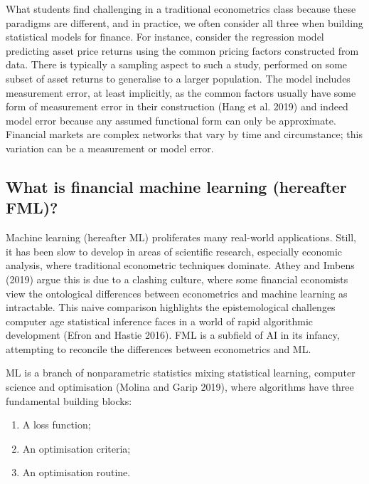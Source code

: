\documentclass{article}
\providecommand{\tightlist}{%
  \setlength{\itemsep}{0pt}\setlength{\parskip}{0pt}}
\begin{document}
What students find challenging in a traditional econometrics class
because these paradigms are different, and in practice, we often
consider all three when building statistical models for finance. For
instance, consider the regression model predicting asset price returns
using the common pricing factors constructed from data. There is
typically a sampling aspect to such a study, performed on some subset of
asset returns to generalise to a larger population. The model includes
measurement error, at least implicitly, as the common factors usually
have some form of measurement error in their construction (Hang et al.
2019) and indeed model error because any assumed functional form can
only be approximate. Financial markets are complex networks that vary by
time and circumstance; this variation can be a measurement or model
error.

\hypertarget{what-is-financial-machine-learning-hereafter-fml}{%
\subsection{What is financial machine learning (hereafter
FML)?}\label{what-is-financial-machine-learning-hereafter-fml}}

Machine learning (hereafter ML) proliferates many real-world
applications. Still, it has been slow to develop in areas of scientific
research, especially economic analysis, where traditional econometric
techniques dominate. Athey and Imbens (2019) argue this is due to a
clashing culture, where some financial economists view the ontological
differences between econometrics and machine learning as intractable.
This naive comparison highlights the epistemological challenges computer
age statistical inference faces in a world of rapid algorithmic
development (Efron and Hastie 2016). FML is a subfield of AI in its
infancy, attempting to reconcile the differences between econometrics
and ML.

ML is a branch of nonparametric statistics mixing statistical learning,
computer science and optimisation (Molina and Garip 2019), where
algorithms have three fundamental building blocks:

\begin{enumerate}
\def\labelenumi{\arabic{enumi}.}
\tightlist
\item
  A loss function;
\item
  An optimisation criteria;
\item
  An optimisation routine.
\end{enumerate}
\end{document}
